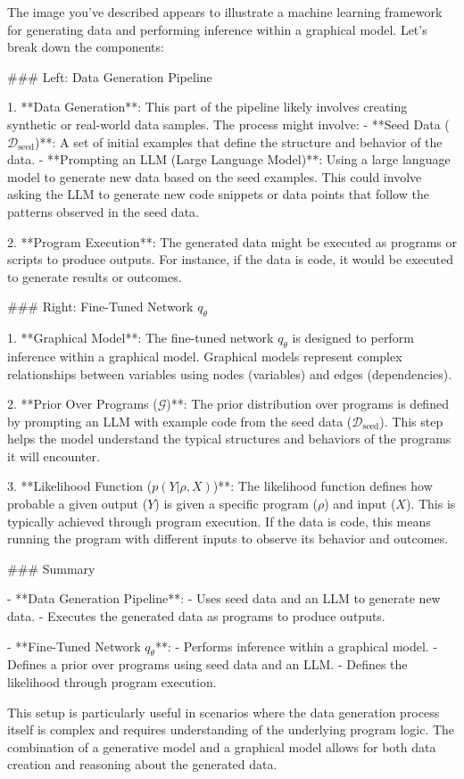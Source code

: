 The image you've described appears to illustrate a machine learning framework for generating data and performing inference within a graphical model. Let's break down the components:

### Left: Data Generation Pipeline

1. **Data Generation**: This part of the pipeline likely involves creating synthetic or real-world data samples. The process might involve:
   - **Seed Data ($\mathcal{D}_\text{seed}$)**: A set of initial examples that define the structure and behavior of the data.
   - **Prompting an LLM (Large Language Model)**: Using a large language model to generate new data based on the seed examples. This could involve asking the LLM to generate new code snippets or data points that follow the patterns observed in the seed data.

2. **Program Execution**: The generated data might be executed as programs or scripts to produce outputs. For instance, if the data is code, it would be executed to generate results or outcomes.

### Right: Fine-Tuned Network $q_\theta$

1. **Graphical Model**: The fine-tuned network $q_\theta$ is designed to perform inference within a graphical model. Graphical models represent complex relationships between variables using nodes (variables) and edges (dependencies).

2. **Prior Over Programs ($\mathcal{G}$)**: The prior distribution over programs is defined by prompting an LLM with example code from the seed data ($\mathcal{D}_\text{seed}$). This step helps the model understand the typical structures and behaviors of the programs it will encounter.

3. **Likelihood Function ($p(Y|\rho, X)$)**: The likelihood function defines how probable a given output ($Y$) is given a specific program ($\rho$) and input ($X$). This is typically achieved through program execution. If the data is code, this means running the program with different inputs to observe its behavior and outcomes.

### Summary

- **Data Generation Pipeline**:
  - Uses seed data and an LLM to generate new data.
  - Executes the generated data as programs to produce outputs.

- **Fine-Tuned Network $q_\theta$**:
  - Performs inference within a graphical model.
  - Defines a prior over programs using seed data and an LLM.
  - Defines the likelihood through program execution.

This setup is particularly useful in scenarios where the data generation process itself is complex and requires understanding of the underlying program logic. The combination of a generative model and a graphical model allows for both data creation and reasoning about the generated data.